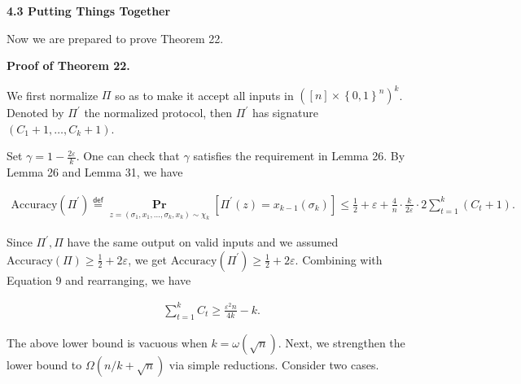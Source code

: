 \par\medskip\noindent\textbf{
4.3 Putting Things Together}\par




Now we are prepared to prove Theorem 22.\par




\par\medskip\noindent\textbf{Proof of Theorem 22.}\par




We first normalize $\Pi$ so as to make it accept all inputs in $([n]\times\left\{0,1\right\}^{n})^{k}$.
Denoted by $\Pi^{\prime}$ the normalized protocol, then $\Pi^{\prime}$ has signature $(C_{1}+1,\dots,C_{k}+1)$.\par




Set $\gamma=1-\frac{2\varepsilon}{k}$.
One can check that $\gamma$ satisfies the requirement in Lemma 26.
By Lemma 26 and Lemma 31,
we have\par


\[\begin{gathered}
\text{Accuracy}(\Pi^{\prime})\stackrel{{\scriptstyle\mathsf{def}}}{{=}}\operatorname*{\mathbf{Pr}}_{z=(\sigma_{1},x_{1},\dots,\sigma_{k},x_{k})\sim\chi_{k}}\left[\Pi^{\prime}(z)=x_{k-1}(\sigma_{k})\right]\leq\frac{1}{2}+\varepsilon+\frac{4}{n}\cdot\frac{k}{2\varepsilon}\cdot 2\sum_{t=1}^{k}(C_{t}+1).
\end{gathered}\]


Since $\Pi^{\prime},\Pi$ have the same output on valid inputs and we assumed $\text{Accuracy}(\Pi)\geq\frac{1}{2}+2\varepsilon$,
we get $\text{Accuracy}(\Pi^{\prime})\geq\frac{1}{2}+2\varepsilon$.
Combining with Equation 9 and rearranging,
we have\par


\[\begin{gathered}
\sum_{t=1}^{k}C_{t}\geq\frac{\varepsilon^{2}n}{4k}-k.
\end{gathered}\]




The above lower bound is vacuous when $k=\omega(\sqrt{n})$.
Next, we strengthen the lower bound to $\Omega(n/k+\sqrt{n})$ via simple reductions. Consider two cases.\par


